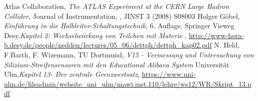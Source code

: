 \begin{thebibliography}{99}
 Atlas Collaboration, \textit{The {ATLAS} Experiment at the {CERN} Large Hadron Collider}, Journal of Instrumentation, , JINST 3 (2008) S08003
 Holger Göbel, \textit{Einführung in die Halbleiter-Schaltungstechnik}, 6. Auflage, Springer Vieweg 
 Desy,\textit{Kapitel 2: Wechselwiirkung von Teilchen mit Materie} , \url{http://www-hera-b.desy.de/people/nedden/lectures/05_06/dettph/dettph_kap02.pdf}
 N. Held, F.Barth, F. Wizemann, TU Dortmund, \textit{V15 - Vermessung und Untersuchung von Silizium-Streifensensoren mit den Educational Alibava System}
 Universität Ulm,\textit{Kapitel 13- Der zentrale Grenzwertsatz}, \url{https://www.uni-ulm.de/fileadmin/website_uni_ulm/mawi.inst.110/lehre/ws12/WR/Skript_13.pdf}
\end{thebibliography}

